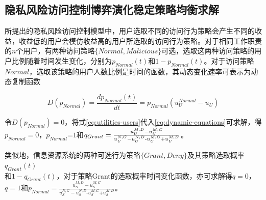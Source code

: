 \subsection{隐私风险访问控制博弈演化稳定策略均衡求解}
\label{subsec:solution}
所提出的隐私风险访问控制模型中，用户选取不同的访问行为策略会产生不同的收益，收益低的用户会模仿收益高的用户所选取的访问行为策略。对于相同工作职责的$n$个用户，有两种访问策略$\{Normal, Malicious\} $可选，选取这两种访问策略的用户比例随着时间发生变化，分别为$p_{Normal}(t)$和$1-p_{Normal}(t)$。对于访问策略$Normal$，选取该策略的用户人数比例是时间的函数，其动态变化速率可表示为动态复制函数

\begin{equation}\label{eq:dynamic-equations}
D({{p}_{Normal}})=\frac{d{{p}_{Normal}}(t)}{dt}={{p}_{Normal}}(u_{U}^{Normal}-{{\overline{u}}_{U}})
\end{equation}

 令$D({{p}_{Normal}})=0$，将式\ref{eq:utilities-users}代入\ref{eq:dynamic-equations}可求解，得${{p}_{Normal}}=0$，${{p}_{Normal}}\text{=}1$和${{q}_{Grant}}=\\\frac{u_{U}^{M,D}-u_{U}^{M,G}}{u_{U}^{N,G}-u_{U}^{N,D}\text{-}u_{U}^{M,G}\text{+}u_{U}^{M,D}}$。
 
 类似地，信息资源系统的两种可选行为策略$\{Grant,Deny\}$及其策略选取概率$q_{Grant}(t)$~\\和$1-q_{Grant}(t)$，对于策略Grant的选取概率时间变化函数，亦可求解得$q=0$，$q=1$和${{p}_{Normal}}=\frac{u_{S}^{M,D}-u_{S}^{M,G}}{u_{S}^{N,G}-u_{S}^{N,D}\text{-}u_{S}^{M,G}\text{+}u_{S}^{M,D}}$。

